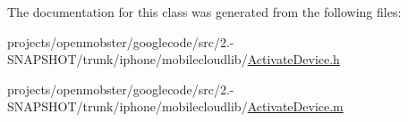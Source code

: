 \-The documentation for this class was generated from the following files\-:\begin{DoxyCompactItemize}
\item 
projects/openmobster/googlecode/src/2.-\/\-S\-N\-A\-P\-S\-H\-O\-T/trunk/iphone/mobilecloudlib/\hyperlink{_activate_device_8h}{\-Activate\-Device.\-h}\item 
projects/openmobster/googlecode/src/2.-\/\-S\-N\-A\-P\-S\-H\-O\-T/trunk/iphone/mobilecloudlib/\hyperlink{_activate_device_8m}{\-Activate\-Device.\-m}\end{DoxyCompactItemize}
